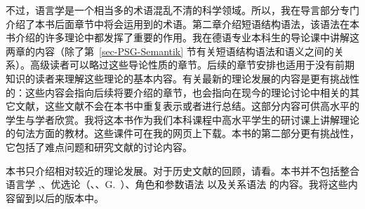 不过，语言学是一个相当多的术语混乱不清的科学领域。所以，我在导言部分专门介绍了本书后面章节中将会运用到的术语。第二章介绍短语结构语法，该语法在本书介绍的许多理论中都发挥了重要的作用。我在德语专业本科生的导论课中讲解这两章的内容（除了第~\ref{sec-PSG-Semantik} 节有关短语结构语法和语义之间的关系）。高级读者可以略过这些导论性质的章节。后续的章节安排也适用于没有前期知识的读者来理解这些理论的基本内容。有关最新的理论发展的内容是更有挑战性的：这些内容会指向后续将要介绍的章节，也会指向在现今的理论讨论中相关的其它文献，这些文献不会在本书中重复表示或者进行总结。这部分内容可供高水平的学生与学者欣赏。我将这本书作为我们本科课程中高水平学生的研讨课上讲解理论的句法方面的教材。这些课件可在我的网页上下载。本书的第二部分更有挑战性，它包括了难点问题和研究文献的讨论内容。

本书只介绍相对较近的理论发展。对于历史文献的回顾，请看。本书并不包括整合语言学
\citep{Lieb83a-u,Eisenberg2004a,Nolda2007a-u},、优选论\indexot （\citealp{PS93a-u}、\citealp{Grimshaw97a-u}、G.\ \citealp{GMueller2000a-u}）、角色和参数语法 \citep{vanValin93a-ed}以及关系语法
\citep{Perlmutter83a-ed,Perlmutter84b-ed}的内容。我将这些内容留到以后的版本中。

